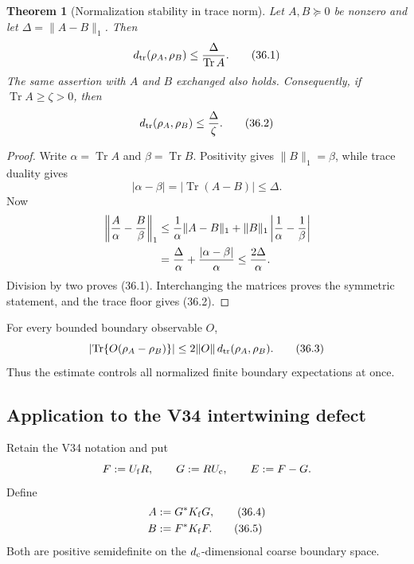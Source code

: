 \documentclass[11pt]{article}
\newtheorem{theorem}{Theorem}[section]
\theoremstyle{remark}
\begin{document}
\begin{theorem}[Normalization stability in trace norm]
\label{thm:v12v36-trace-normalization}
Let \(A,B\succeq0\) be nonzero and let
\(\Delta=\|A-B\|_1\).  Then
\begin{equation}
 d_{\rm tr}(\rho_A,\rho_B)
 \leq
 {\Delta\over\operatorname{Tr}A}.                \tag{36.1}
\end{equation}
The same assertion with \(A\) and \(B\) exchanged also holds.
Consequently, if \(\operatorname{Tr}A\geq\zeta>0\), then
\begin{equation}
 d_{\rm tr}(\rho_A,\rho_B)\leq{\Delta\over\zeta}.
                                                               \tag{36.2}
\end{equation}
\end{theorem}

\begin{proof}
Write \(\alpha=\operatorname{Tr}A\) and
\(\beta=\operatorname{Tr}B\).  Positivity gives
\(\|B\|_1=\beta\), while trace duality gives
\[
 |\alpha-\beta|
 =
 |\operatorname{Tr}(A-B)|
 \leq\Delta.
\]
Now
\begin{align*}
 \left\|{A\over\alpha}-{B\over\beta}\right\|_1
 &\leq
 {1\over\alpha}\|A-B\|_1
 +
 \|B\|_1\left|{1\over\alpha}-{1\over\beta}\right|\\
 &=
 {\Delta\over\alpha}
 +
 {|\alpha-\beta|\over\alpha}
 \leq {2\Delta\over\alpha}.
\end{align*}
Division by two proves (36.1).  Interchanging the matrices proves the
symmetric statement, and the trace floor gives (36.2).
\end{proof}

For every bounded boundary observable \(O\),
\begin{equation}
 \left|
 \operatorname{Tr}\{O(\rho_A-\rho_B)\}
 \right|
 \leq
 2\|O\|\,d_{\rm tr}(\rho_A,\rho_B).               \tag{36.3}
\end{equation}
Thus the estimate controls all normalized finite boundary
expectations at once.

\subsection{Application to the V34 intertwining defect}

Retain the V34 notation and put
\[
 F:=U_{\rm f}R,\qquad
 G:=RU_{\rm c},\qquad
 E:=F-G.
\]
Define
\begin{align}
 A&:=G^*K_{\rm f}G,                              \tag{36.4}\\
 B&:=F^*K_{\rm f}F.                              \tag{36.5}
\end{align}
Both are positive semidefinite on the \(d_{\rm c}\)-dimensional
coarse boundary space.
\end{document}
